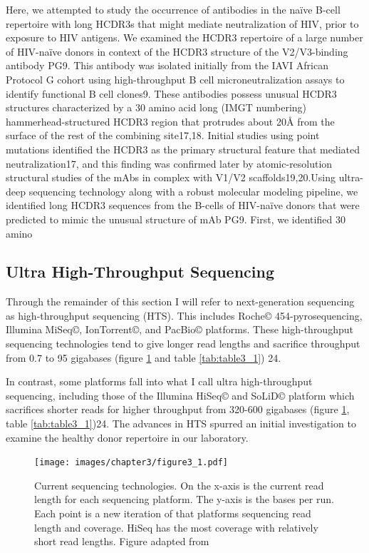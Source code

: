 Here, we attempted to study the occurrence of antibodies in the naïve B-cell repertoire with long HCDR3s that might mediate neutralization of HIV, prior to exposure to HIV antigens. We examined the HCDR3 repertoire of a large number of HIV-naïve donors in context of the HCDR3 structure of the V2/V3-binding antibody PG9. This antibody was isolated initially from the IAVI African Protocol G cohort using high-throughput B cell microneutralization assays to identify functional B cell clones9. These antibodies possess unusual HCDR3 structures characterized by a 30 amino acid long (IMGT numbering) hammerhead-structured HCDR3 region that protrudes about 20Å from the surface of the rest of the combining site17,18. Initial studies using point mutations identified the HCDR3 as the primary structural feature that mediated neutralization17, and this finding was confirmed later by atomic-resolution structural studies of the mAbs in complex with V1/V2 scaffolds19,20.Using ultra-deep sequencing technology along with a robust molecular modeling pipeline, we identified long HCDR3 sequences from the B-cells of HIV-naïve donors that were predicted to mimic the unusual structure of mAb PG9. First, we identified 30 amino

\subsection{Ultra High-Throughput Sequencing}
Through the remainder of this section I will refer to next-generation sequencing as high-throughput sequencing (HTS). This includes Roche© 454-pyrosequencing, Illumina MiSeq©, IonTorrent©, and PacBio© platforms. These high-throughput sequencing technologies tend to give longer read lengths and sacrifice throughput from 0.7 to 95 gigabases (figure \ref{fig:figure3_1} and table \ref{tab:table3_1}) 24.

In contrast, some platforms fall into what I call ultra high-throughput sequencing, including those of the Illumina HiSeq© and SoLiD© platform which sacrifices shorter reads for higher throughput from 320-600 gigabases (figure \ref{fig:figure3_1}, table \ref{tab:table3_1})24. The advances in HTS spurred an initial investigation to examine the healthy donor repertoire in our laboratory.

\begin{figure}
   \centering
   \texttt{[image: images/chapter3/figure3\_1.pdf]} %
   \caption[Current Sequencing Technologies]{Current sequencing technologies. On the x-axis is the current read length for each sequencing platform. The y-axis is the bases per run. Each point is a new iteration of that platforms sequencing read length and coverage. HiSeq has the most coverage with relatively short read lengths. Figure adapted from \citep{developmentinNGS:2012bs} }
   \label{fig:figure3_1}
\end{figure}


